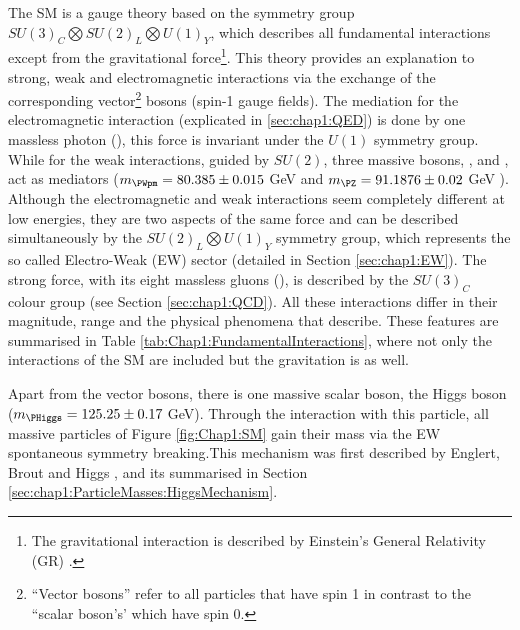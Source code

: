 The SM is a gauge theory based on the symmetry group $SU(3)_{C} \bigotimes SU(2)_{L} \bigotimes U(1)_{Y}$, which
describes all fundamental interactions except from the gravitational force\footnote{The gravitational interaction is described by Einstein's General Relativity (GR) \cite{Einstein:1916vd}.}.
This theory provides an explanation to strong, weak and electromagnetic interactions via the exchange of the corresponding
vector\footnote{``Vector bosons'' refer to all particles that have spin 1 in contrast to the ``scalar boson's' which have spin 0.} bosons (spin-1 gauge fields).
The mediation for the electromagnetic interaction (explicated in \ref{sec:chap1:QED}) 
is done by one massless photon (\Pgamma), this force is invariant under the $U(1)$ symmetry group.
While for the weak interactions, guided by $SU(2)$, three massive bosons,
\PWplus, \PWminus and \PZ, act as mediators ($m_{\PWpm}= 80.385\pm0.015\;$GeV \cite{ATLAS:2017rzl} and $m_{\PZ}= 91.1876\pm0.02\;$GeV \cite{ALEPH:2005ab}). 
Although the electromagnetic and weak interactions seem completely different at low energies, they are two aspects of the same force and
can be described simultaneously by the $SU(2)_{L} \bigotimes U(1)_{Y}$ 
symmetry group, which represents the so called Electro-Weak (EW) sector (detailed in Section \ref{sec:chap1:EW}).
The strong force, with its eight massless gluons (\Pgluon), is described by the $SU(3)_{C}$ colour group (see Section \ref{sec:chap1:QCD}). 
All these interactions differ in their magnitude, range and the physical phenomena that describe. These features
are summarised in Table \ref{tab:Chap1:FundamentalInteractions}, where not only the interactions of the SM are included but the
gravitation is as well.  

Apart from the vector bosons, there is one massive scalar boson, the Higgs boson ($m_{\PHiggs} = 125.25 \pm 0.17\;$GeV). 
Through the interaction with this particle, all massive particles of Figure \ref{fig:Chap1:SM} gain their mass via the EW spontaneous symmetry breaking.This mechanism was first described by Englert, Brout \cite{Englert:1964et} and Higgs \cite{Higgs:1964pj}, and its 
summarised in Section \ref{sec:chap1:ParticleMasses:HiggsMechanism}. 

